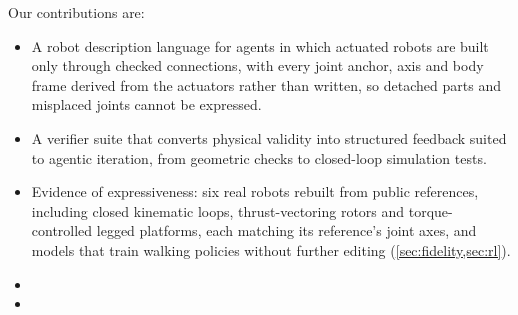 Our contributions are:
\begin{itemize}
\item A robot description language for agents in which actuated robots are built only through
  checked connections, with every joint anchor, axis and body frame derived from the actuators
  rather than written, so detached parts and misplaced joints cannot be expressed.
\item A verifier suite that converts physical validity into structured feedback suited to
  agentic iteration, from geometric checks to closed-loop simulation tests.
\item Evidence of expressiveness: six real robots rebuilt from public references, including
  closed kinematic loops, thrust-vectoring rotors and torque-controlled legged platforms, each
  matching its reference's joint axes, and models that train walking policies without further
  editing (\cref{sec:fidelity,sec:rl}).
\item {}
\item {}
\end{itemize}
